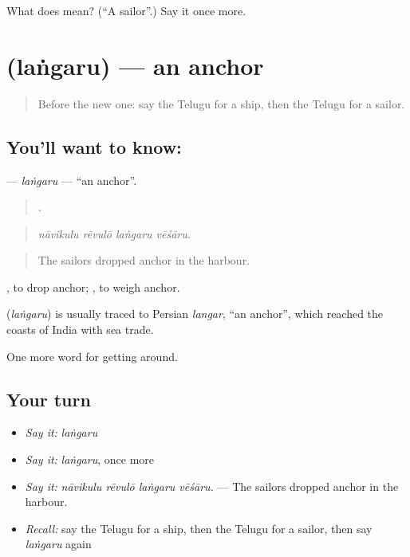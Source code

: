 \begin{tcolorbox}[breakable,colback=teal!4,colframe=teal!35!black,title={Before you move on}]
What does  mean? (\textquotedblleft{}A sailor\textquotedblright{}.) Say it once more.
\end{tcolorbox}
\section[\texorpdfstring{\te{లంగరు} (laṅgaru)}{లంగరు (laṅgaru)}]{ (laṅgaru) — an anchor}

\label{lesson:TE-C452-langaru}



\begin{quote}
Before the new one: say the Telugu for a ship, then the Telugu for a sailor.
\end{quote}

\subsection*{You'll want to know: }
\textbf{} — \emph{laṅgaru} — \textquotedblleft{}an anchor\textquotedblright{}.

\begin{quote}
   .
\end{quote}

\begin{quote}
\emph{nāvikulu rēvulō laṅgaru vēśāru.}
\end{quote}

\begin{quote}
The sailors dropped anchor in the harbour.
\end{quote}

 , to drop anchor;  , to weigh anchor.

\begin{cousinweb}
\textbf{} (\emph{laṅgaru}) is usually traced to Persian \emph{langar}, \textquotedblleft{}an anchor\textquotedblright{}, which reached the coasts of India with sea trade.
\end{cousinweb}

\begin{grammarlens}[title={What you've built}]
One more word for getting around.
\end{grammarlens}

\subsection*{Your turn}
\begin{itemize}
\raggedright
  \item \emph{Say it:} \emph{laṅgaru}
  \item \emph{Say it:} \emph{laṅgaru}, once more
  \item \emph{Say it:} \emph{nāvikulu rēvulō laṅgaru vēśāru.} — The sailors dropped anchor in the harbour.
  \item \emph{Recall:} say the Telugu for a ship, then the Telugu for a sailor, then say \emph{laṅgaru} again
\end{itemize}

